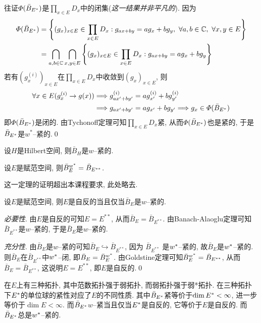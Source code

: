 \begin{Proof}
	往证$ \varPhi(\bar{B}_{E^{*}}) $是$ \prod\limits_{x\in E}D_x $中的闭集(\textsl{这一结果并非平凡的}). 因为
	\[
		\begin{aligned}
			\varPhi(\bar{B}_{\Star{E}}) & =\left\{ (g_x)_{x\in E}\in\prod_{x\in E}D_x : g_{ax+by}=ag_x+bg_y,\ \forall a,b\in\C,\ \forall x,y\in E \right\} \\
			                            & =\bigcap_{a,b\in\C}\bigcap_{x,y\in E}\left\{ (g_x)_{x\in E}\in\prod_{x\in E}D_x : g_{ax+by}=ag_x+bg_y \right\}
		\end{aligned}
	\]
	若有$ (g_x^{(i)})_{x\in E} $在$ \prod\limits_{x\in E}D_x $中收敛到$ (g_x)_{x\in E} $, 则
	\[
		\begin{aligned}
			\forall x\in E(g_x^{(i)}\to g(x)) & \Longrightarrow g_{ax'+by'}^{(i)}=ag_{x'}^{(i)}+bg_{y'}^{(i)}                                \\
			                                  & \Longrightarrow g_{ax'+by'}=ag_{x'}+bg_{y'}\Longrightarrow g_x\in\varPhi(\bar{B}_{E^{*}})
		\end{aligned}
	\]
	即$ \varPhi(\bar{B}_{E^{*}}) $是闭的. 由Tychonoff定理可知$ \prod\limits_{x\in E}D_x $紧, 从而$ \varPhi(\bar{B}_{E^{*}}) $也是紧的, 于是$ \bar{B}_{E^{*}} $是$ w^* $--紧的.\qed
\end{Proof}

\begin{Corollary}
	设$ H $是Hilbert空间, 则$ \bar{B}_H $是$ w $--紧的.
\end{Corollary}

\begin{Theorem}[Goldstine]
	设$ E $是赋范空间, 则$ \bar{B}_E^{w^{*}}=\bar{B}_{E^{**}} $.
\end{Theorem}

这一定理的证明超出本课程要求, 此处略去.

\begin{Corollary}[Banach]
	设$ E $是赋范空间, 则$ E $是自反的当且仅当$ \bar{B}_E $是$ w $--紧的.
\end{Corollary}
\begin{Proof}
	\textsl{必要性}. 由$ E $是自反的可知$ E=E^{**} $, 从而$ \bar{B}_E=\bar{B}_{E^{**}} $. 由Banach-Alaoglu定理可知$ \bar{B}_{E^{**}} $是$ w $--紧的, 于是$ \bar{B}_E $是$ w $--紧的.

	\textsl{充分性}. 由$ \bar{B}_E $是$ w $--紧的可知$ \bar{B}_E\hookrightarrow\bar{B}_{E^{**}} $, 因为 $ \bar{B}_{E^{**}} $ 是$ w^{*} $--紧的, 故$ \bar{B}_E $是$ w^{*} $--紧的. 则$ \bar{B}_E $在$ \bar{B}_{E^{**}} $中$ w^{*} $--闭, 即$ \bar{B}_E=\bar{B}_E^{w^{*}} $. 由Goldstine定理可知$ \bar{B}_E^{w^{*}}=\bar{B}_{E^{**}} $, 从而$ \bar{B}_E=\bar{B}_{E^{**}} $, 这说明$ E=E^{**} $, 即$ E $是自反的.\qed
\end{Proof}

\begin{Remark}
	在$ E $上有三种拓扑, 其中范数拓扑强于弱拓扑, 而弱拓扑强于弱*拓扑. 在三种拓扑下$ E^{*} $的单位球的紧性对应了$ E $的不同性质. 其中$ \bar{B}_{E^{*}} $紧等价于$ \dim E^{*}<\infty $, 进一步等价于$ \dim E<\infty $. 而$ \bar{B}_{E^{*}} $$ w $--紧当且仅当$ E^{*} $是自反的, 它等价于$ E $是自反的. 而$ \bar{B}_{E^{*}} $总是$ w^{*} $--紧的.
\end{Remark}
